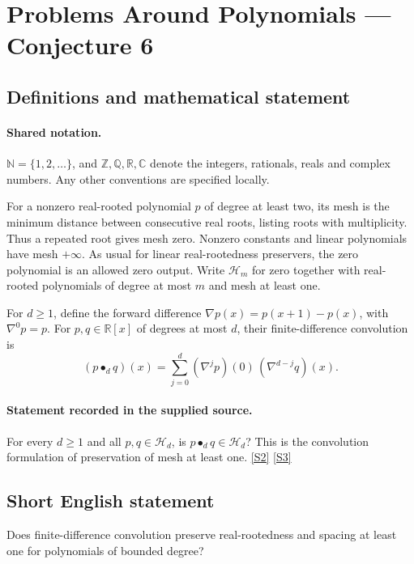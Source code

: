 \documentclass[11pt]{article}
\newcommand{\sref}[2]{\hyperlink{source:#1:#2}{[S#2]}}
\begin{document}
\section{Problems Around Polynomials — Conjecture 6}\label{statement}

\subsection{Definitions and mathematical statement}

\paragraph{Shared notation.}$\mathbb N=\{1,2,\ldots\}$, and $\mathbb Z,\mathbb Q,\mathbb R,\mathbb C$ denote the integers, rationals, reals and complex numbers. Any other conventions are specified locally.


For a nonzero real-rooted polynomial $p$ of degree at least two, its mesh is the minimum distance between consecutive real roots, listing roots with multiplicity. Thus a repeated root gives mesh zero. Nonzero constants and linear polynomials have mesh $+\infty$. As usual for linear real-rootedness preservers, the zero polynomial is an allowed zero output. Write $\mathcal H_m$ for zero together with real-rooted polynomials of degree at most $m$ and mesh at least one.\par For $d\geq1$, define the forward difference $\nabla p(x)=p(x+1)-p(x)$, with $\nabla^0p=p$. For $p,q\in\mathbb R[x]$ of degrees at most $d$, their finite-difference convolution is
\[(p\bullet_d q)(x)=\sum_{j=0}^{d}(\nabla^jp)(0)\,(\nabla^{d-j}q)(x).\]
\paragraph{Statement recorded in the supplied source.}
For every $d\geq1$ and all $p,q\in\mathcal H_d$, is $p\bullet_d q\in\mathcal H_d$? This is the convolution formulation of preservation of mesh at least one. \sref{statement}{2} \sref{statement}{3}
\subsection{Short English statement}
Does finite-difference convolution preserve real-rootedness and spacing at least one for polynomials of bounded degree?
\end{document}
